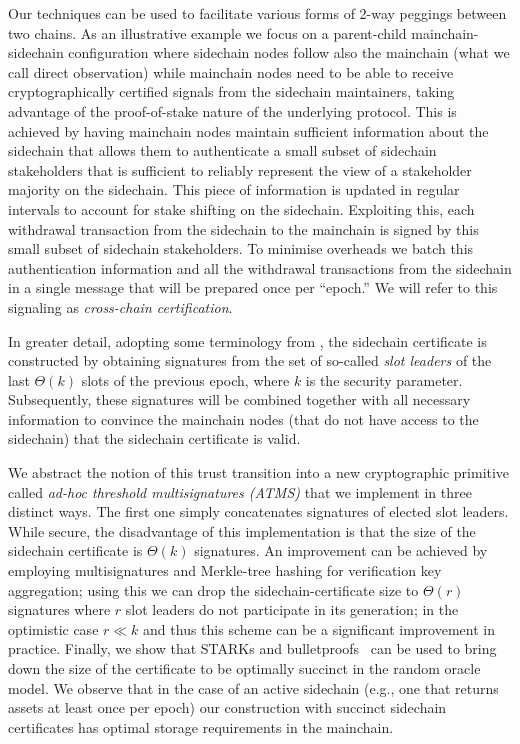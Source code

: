 Our techniques can be used to facilitate various forms of 2-way peggings
between two chains. As an illustrative example we focus on a parent-child
mainchain-sidechain
configuration where sidechain nodes follow also the mainchain (what we call direct observation) while mainchain nodes need to be able to receive cryptographically
certified signals
from the sidechain maintainers,
taking advantage of the proof-of-stake nature of the underlying protocol. This is achieved by having
mainchain nodes maintain sufficient information about the sidechain that allows
them to authenticate a
small subset of  sidechain stakeholders that is sufficient to
reliably represent the view of a stakeholder majority on the sidechain.
This piece of information is updated in regular intervals to account
for  stake shifting on the sidechain.
Exploiting this, each withdrawal  transaction from the sidechain to the mainchain
is signed by this  small subset of sidechain stakeholders.
To minimise overheads we batch this authentication information and all the withdrawal transactions from
the sidechain in a single message that will be prepared once per ``epoch.'' We will
refer to this signaling  as
 {\em cross-chain certification}.

In greater detail, adopting some terminology  from \cite{ouroboros},
the sidechain certificate  is constructed by obtaining
signatures  from the set of so-called \emph{slot leaders} of the last
$\Theta(k)$ slots of the previous epoch, where $k$ is the security parameter.
Subsequently, these signatures will be combined together with all necessary
information to convince the mainchain nodes (that do not have access to the
sidechain) that the sidechain certificate is valid.

We abstract the notion of
this trust transition into a new cryptographic primitive called
\emph{ad-hoc threshold multisignatures (ATMS)}
that we implement in three distinct ways. The first one
simply concatenates signatures of elected slot leaders. While secure, the disadvantage of
this implementation is that the size of the sidechain certificate is
$\Theta(k)$ signatures.
An improvement can be achieved by
employing multisignatures and Merkle-tree hashing for verification key aggregation;  using this we can drop the sidechain-certificate size to
$\Theta(r)$ signatures where $r$  slot leaders do not participate in its generation; in the optimistic case $r\ll k$ and thus this scheme can be
a significant improvement in practice. Finally, we show that STARKs and bulletproofs~\cite{ben2017scalable,bulletproofs}
can be used to bring down the size of the certificate to be optimally succinct in the random oracle model.  We observe that in the case of an active sidechain (e.g., one that returns assets
at least once per epoch) our construction with succinct sidechain
certificates has optimal storage requirements in the mainchain.

